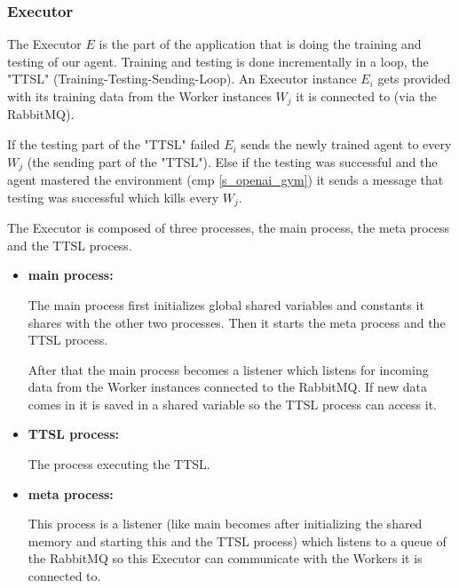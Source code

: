 \subsubsection{Executor}
\label{s_executor}

The Executor $E$ is the part of the application that is
doing the training and testing of our agent. Training and
testing is done incrementally in a loop, the "TTSL"
(Training-Testing-Sending-Loop). An Executor instance
$E_i$ gets provided with its training data from the Worker
instances $W_j$ it is connected to (via the RabbitMQ).

If the testing part of the "TTSL" failed $E_i$ sends the
newly trained agent to every $W_j$ (the sending part of the
"TTSL"). Else if the testing was successful and the agent
mastered the environment (cmp \ref{s_openai_gym}) it sends
a message that testing was successful which kills every
$W_j$.

The Executor is composed of three processes, the main
process, the meta process and the TTSL process.

\begin{itemize}[label={}]

  \item \textbf{main process:}

        The main process first initializes global shared
        variables and constants it shares with the other
        two processes. Then it starts the meta process and
        the TTSL process.

        After that the main process becomes a listener
        which listens for incoming data from the Worker
        instances connected to the RabbitMQ. If new data
        comes in it is saved in a shared variable so the
        TTSL process can access it.

  \item \textbf{TTSL process:}

        The process executing the TTSL.

  \item \textbf{meta process:}

        This process is a listener (like main becomes after
        initializing the shared memory and starting this
        and the TTSL process) which listens to a queue
        of the RabbitMQ so this Executor can communicate
        with the Workers it is connected to.

\end{itemize}



